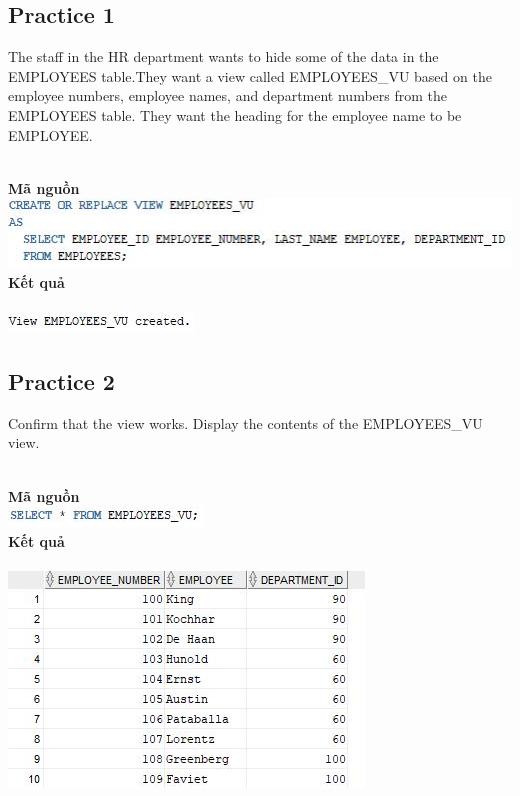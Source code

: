 \documentclass[12pt,a4paper]{report}
\begin{document}
\subsection{Practice 1}
\begin{boxedminipage}[t]{15.5cm}
	The staff in the HR department wants to hide some of the data in the EMPLOYEES table.They want a view called EMPLOYEES\_VU based on the employee numbers, employee names, and department numbers from the EMPLOYEES table. They want the heading for the employee name to be EMPLOYEE.
\end{boxedminipage}
\newline
\\
\textbf{Mã nguồn}
\\
\newline
\includegraphics[scale=1]{p13.jpg}\\
\textbf{Kết quả}\\\\
\includegraphics[scale=1]{kp13.jpg}

\subsection{Practice 2}
\begin{boxedminipage}[t]{15.5cm}
	Confirm that the view works. Display the contents of the EMPLOYEES\_VU view.
\end{boxedminipage}
\newline
\\
\textbf{Mã nguồn}
\\
\newline
\includegraphics[scale=1]{p23.jpg}\\
\textbf{Kết quả}\\\\
\includegraphics[scale=1]{kp23.jpg}
\end{document}
